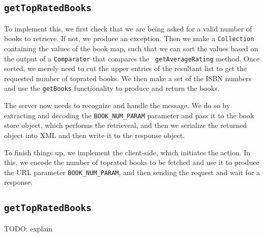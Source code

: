 \subsection{\tt getTopRatedBooks}
To implement this, we first check that we are being asked for a valid number of
books to retrieve. If not, we produce an exception. Then we make a
{\tt Collection} containing the values of the book map, such that we can sort
the values based on the output of a {\tt Comparator} that compares the {\tt
getAverageRating} method. Once sorted, we merely need to cut the upper entries
of the resultant list to get the requested number of toprated books. We then
make a set of the ISBN numbers and use the {\tt getBooks} functionality to
produce and return the books.

The server now needs to recognize and handle the message. We do so by
extracting and decoding the {\tt BOOK\_NUM\_PARAM} parameter and pass it to the
book store object, which performs the retrieveal, and then we serialize the
returned object into XML and then write it to the response object.

To finish things up, we implement the client-side, which initiates the action.
In this, we encode the number of toprated books to be fetched and use it to
produce the URL parameter {\tt BOOK\_NUM\_PARAM}, and then sending the request
and wait for a response.

\subsection{\tt getTopRatedBooks}
TODO: explain
